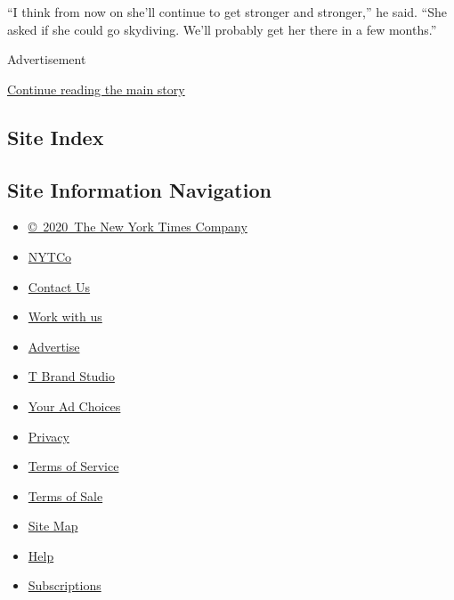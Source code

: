 ``I think from now on she'll continue to get stronger and stronger,'' he
said. ``She asked if she could go skydiving. We'll probably get her
there in a few months.''

Advertisement

\protect\hyperlink{after-bottom}{Continue reading the main story}

\hypertarget{site-index}{%
\subsection{Site Index}\label{site-index}}

\hypertarget{site-information-navigation}{%
\subsection{Site Information
Navigation}\label{site-information-navigation}}

\begin{itemize}
\tightlist
\item
  \href{https://help.nytimes.com/hc/en-us/articles/115014792127-Copyright-notice}{©~2020~The
  New York Times Company}
\end{itemize}

\begin{itemize}
\tightlist
\item
  \href{https://www.nytco.com/}{NYTCo}
\item
  \href{https://help.nytimes.com/hc/en-us/articles/115015385887-Contact-Us}{Contact
  Us}
\item
  \href{https://www.nytco.com/careers/}{Work with us}
\item
  \href{https://nytmediakit.com/}{Advertise}
\item
  \href{http://www.tbrandstudio.com/}{T Brand Studio}
\item
  \href{https://www.nytimes.com/privacy/cookie-policy\#how-do-i-manage-trackers}{Your
  Ad Choices}
\item
  \href{https://www.nytimes.com/privacy}{Privacy}
\item
  \href{https://help.nytimes.com/hc/en-us/articles/115014893428-Terms-of-service}{Terms
  of Service}
\item
  \href{https://help.nytimes.com/hc/en-us/articles/115014893968-Terms-of-sale}{Terms
  of Sale}
\item
  \href{https://spiderbites.nytimes.com}{Site Map}
\item
  \href{https://help.nytimes.com/hc/en-us}{Help}
\item
  \href{https://www.nytimes.com/subscription?campaignId=37WXW}{Subscriptions}
\end{itemize}
